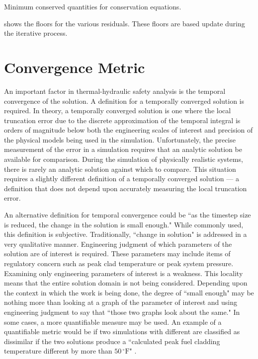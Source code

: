 \begin{table}[ht]
\centering

\caption{Minimum conserved quantities for conservation equations.}
\label{tab:minimumConservedValues}
\end{table}

 shows the floors for the various residuals.
These floors are based update during the iterative process.

\section{Convergence Metric}
\label{sect:temporal_convergence}

An important factor in thermal-hydraulic safety analysis is the temporal convergence of the solution.
A definition for a temporally converged solution is required.
In theory, a temporally converged solution is one where the local truncation error due to the discrete approximation of the temporal integral is orders of magnitude below both the engineering scales of interest and precision of the physical models being used in the simulation.
Unfortunately, the precise measurement of the error in a simulation requires that an analytic solution be available for comparison.
During the simulation of physically realistic systems, there is rarely an analytic solution against which to compare.
This situation requires a slightly different definition of a temporally converged solution --- a definition that does not depend upon accurately measuring the local truncation error.

An alternative definition for temporal convergence could be ``as the timestep size is reduced, the change in the solution is small enough."
While commonly used, this definition is subjective.
Traditionally, ``change in solution" is addressed in a very qualitative manner.
Engineering judgment of which parameters of the solution are of interest is required.
These parameters may include items of regulatory concern such as peak clad temperature or peak system pressure.
Examining only engineering parameters of interest is a weakness.
This locality means that the entire solution domain is not being considered.
Depending upon the context in which the work is being done, the degree of ``small enough" may be nothing more than looking at a graph of the parameter of interest and using engineering judgment to say that ``those two graphs look about the same."
In some cases, a more quantifiable measure may be used.
An example of a quantifiable metric would be if two simulations with different \dtmax{} are classified as dissimilar if the two solutions produce a ``calculated peak fuel cladding temperature different by more than $50\,^{\circ}\mathrm{F}$" \cite{CFR10}.

